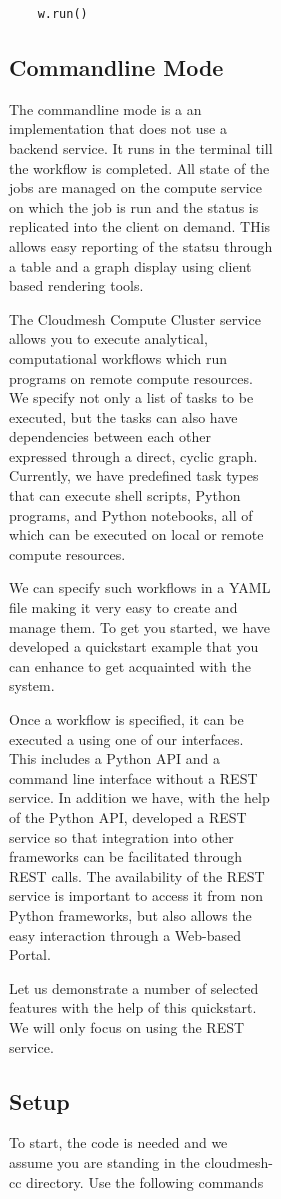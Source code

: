 \begin{figure}[htb]
\begin{figure}[htb]
\begin{figure}[htb]
\begin{verbatim}
    w.run()
\end{verbatim}


\subsection{Commandline Mode}

The commandline mode is a an implementation that does not use a
backend service. It runs in the terminal till the workflow is
completed. All state of the jobs are managed on the compute service on
which the job is run and the status is replicated into the client on
demand. THis allows easy reporting of the statsu through a table and a
graph display using client based rendering tools. 


The Cloudmesh Compute Cluster service allows you to execute analytical,
computational workflows which run programs on remote compute resources.
We specify not only a list of tasks to be executed, but the tasks can
also have dependencies between each other expressed through a direct,
cyclic graph. Currently, we have predefined task types that can execute
shell scripts, Python programs, and Python notebooks, all of which can
be executed on local or remote compute resources.


We can specify such workflows in a YAML file making it very easy to
create and manage them. To get you started, we have developed a
quickstart example that you can enhance to get acquainted with the
system.

Once a workflow is specified, it can be executed a using one of our
interfaces. This includes a Python API and a command line interface
without a REST service. In addition we have, with the help of the Python
API, developed a REST service so that integration into other frameworks
can be facilitated through REST calls. The availability of the REST
service is important to access it from non Python frameworks, but also
allows the easy interaction through a Web-based Portal.

Let us demonstrate a number of selected features with the help of this
quickstart. We will only focus on using the REST service.

\subsection{Setup}\label{setup}

To start, the code is needed and we assume you are standing in the
cloudmesh-cc directory. Use the following commands


\end{figure}
\end{figure}
\end{figure}
